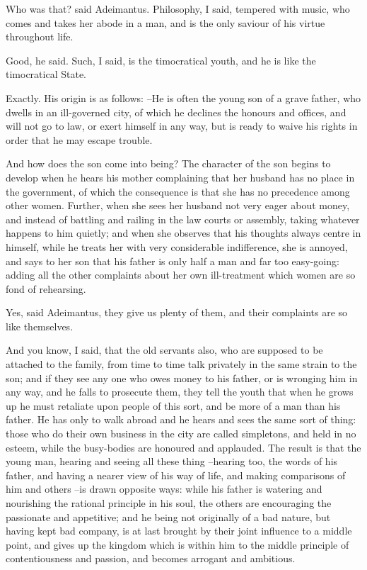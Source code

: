 Who was that? said Adeimantus.
Philosophy, I said, tempered with music, who comes and takes her abode in a man, and is the only saviour of his virtue throughout life.

Good, he said.
Such, I said, is the timocratical youth, and he is like the timocratical State.

Exactly.
His origin is as follows: --He is often the young son of a grave father, who dwells in an ill-governed city, of which he declines the honours and offices, and will not go to law, or exert himself in any way, but is ready to waive his rights in order that he may escape trouble.

And how does the son come into being?
The character of the son begins to develop when he hears his mother complaining that her husband has no place in the government, of which the consequence is that she has no precedence among other women. Further, when she sees her husband not very eager about money, and instead of battling and railing in the law courts or assembly, taking whatever happens to him quietly; and when she observes that his thoughts always centre in himself, while he treats her with very considerable indifference, she is annoyed, and says to her son that his father is only half a man and far too easy-going: adding all the other complaints about her own ill-treatment which women are so fond of rehearsing.

Yes, said Adeimantus, they give us plenty of them, and their complaints are so like themselves.

And you know, I said, that the old servants also, who are supposed to be attached to the family, from time to time talk privately in the same strain to the son; and if they see any one who owes money to his father, or is wronging him in any way, and he falls to prosecute them, they tell the youth that when he grows up he must retaliate upon people of this sort, and be more of a man than his father. He has only to walk abroad and he hears and sees the same sort of thing: those who do their own business in the city are called simpletons, and held in no esteem, while the busy-bodies are honoured and applauded. The result is that the young man, hearing and seeing all these thing --hearing too, the words of his father, and having a nearer view of his way of life, and making comparisons of him and others --is drawn opposite ways: while his father is watering and nourishing the rational principle in his soul, the others are encouraging the passionate and appetitive; and he being not originally of a bad nature, but having kept bad company, is at last brought by their joint influence to a middle point, and gives up the kingdom which is within him to the middle principle of contentiousness and passion, and becomes arrogant and ambitious.

